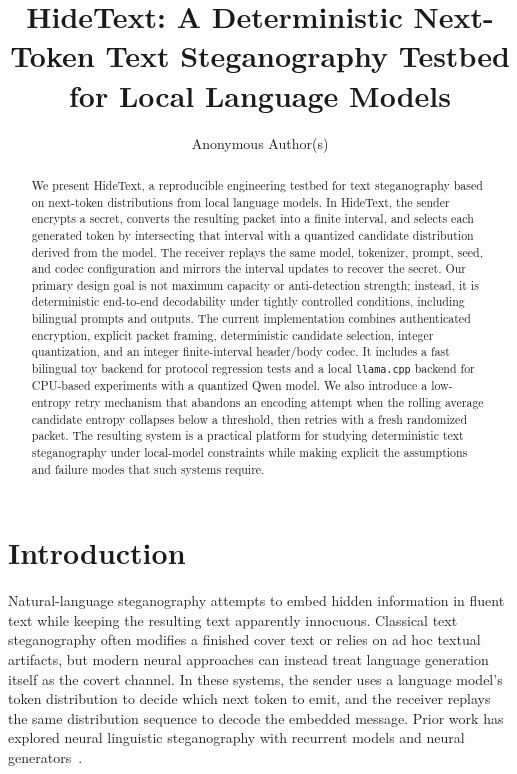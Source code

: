 \documentclass[sigconf,review,anonymous]{acmart}
\title{HideText: A Deterministic Next-Token Text Steganography Testbed for Local Language Models}
\author{Anonymous Author(s)}
\affiliation{%
  \institution{Anonymous Institution}
  \city{Anonymous City}
  \country{Anonymous Country}
}
\begin{document}
\begin{abstract}
We present HideText, a reproducible engineering testbed for text steganography based on next-token distributions from local language models. In HideText, the sender encrypts a secret, converts the resulting packet into a finite interval, and selects each generated token by intersecting that interval with a quantized candidate distribution derived from the model. The receiver replays the same model, tokenizer, prompt, seed, and codec configuration and mirrors the interval updates to recover the secret. Our primary design goal is not maximum capacity or anti-detection strength; instead, it is deterministic end-to-end decodability under tightly controlled conditions, including bilingual prompts and outputs. The current implementation combines authenticated encryption, explicit packet framing, deterministic candidate selection, integer quantization, and an integer finite-interval header/body codec. It includes a fast bilingual toy backend for protocol regression tests and a local \texttt{llama.cpp} backend for CPU-based experiments with a quantized Qwen model. We also introduce a low-entropy retry mechanism that abandons an encoding attempt when the rolling average candidate entropy collapses below a threshold, then retries with a fresh randomized packet. The resulting system is a practical platform for studying deterministic text steganography under local-model constraints while making explicit the assumptions and failure modes that such systems require.
\end{abstract}

\maketitle

\section{Introduction}

Natural-language steganography attempts to embed hidden information in fluent text while keeping the resulting text apparently innocuous. Classical text steganography often modifies a finished cover text or relies on ad hoc textual artifacts, but modern neural approaches can instead treat language generation itself as the covert channel. In these systems, the sender uses a language model's token distribution to decide which next token to emit, and the receiver replays the same distribution sequence to decode the embedded message. Prior work has explored neural linguistic steganography with recurrent models and neural generators~\cite{yang2018rnnstega,ziegler2019neural,zhang2021provably,nozaki2022addressing}.
\end{document}
